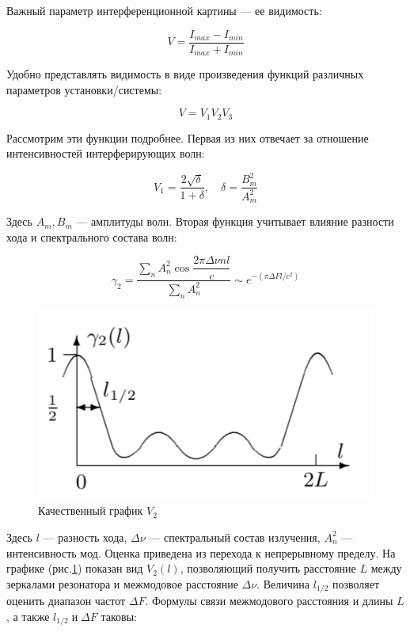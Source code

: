 \documentclass[12pt]{kiarticle}
\begin{document}
	Важный параметр интерференционной картины --- ее видимость:
	
	\begin{equation}\label{V0}
	V = \dfrac{I_{max} - I_{min}}{I_{max} + I_{min}}
	\end{equation}
	
	Удобно представлять видимость в виде произведения функций различных параметров установки/системы:
	
	\begin{equation}\label{VVV}
	V = V_1 V_2 V_3
	\end{equation}
	
	Рассмотрим эти функции подробнее. Первая из них отвечает за отношение интенсивностей интерферирующих волн:
	
	\begin{equation}\label{V1}
	V_1 = \dfrac{2\sqrt{\delta}}{1 + \delta}, \quad \delta = \dfrac{B_m^2}{A_m^2}
	\end{equation}
	
	
	Здесь $ A_m, B_m $ --- амплитуды волн. Вторая функция учитывает влияние разности хода и спектрального состава волн:
	
	
	\begin{equation}\label{}
	\gamma_2 = \dfrac{\sum\limits_n A_n^2 \cos{\dfrac{2\pi \Delta \nu n l}{c}}}{\sum\limits_n A_n^2} \sim e^{-(\pi \Delta F l /c^2)}
	\end{equation}
	
		\begin{figure} 
		\includegraphics[width=\linewidth]{v2.png}
		\caption{Качественный график $ V_2 $}
		\label{V2graf}
	\end{figure}
	
	
	Здесь $ l $ --- разность хода, $ \Delta\nu $ --- спектральный состав излучения, $ A_n^2 $ --- интенсивность мод. Оценка приведена из перехода к непрерывному пределу. На графике (рис.\ref{V2graf}) показан вид $ V_2(l) $, позволяющий получить расстояние $ L $ между зеркалами резонатора и межмодовое расстояние $ \Delta \nu $. Величина $ l_{1/2} $  позволяет оценить диапазон частот $ \Delta F $.
	Формулы связи межмодового расстояния и длины $ L $, а также $ l_{1/2} \; и \; \Delta F $ таковы:
	
\end{document}
